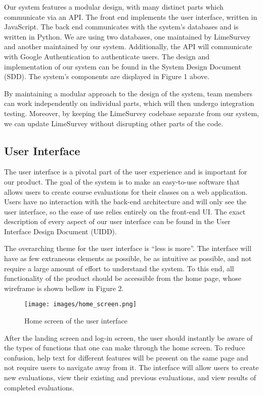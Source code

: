 \documentclass{article}
\begin{document}
Our system features a modular design, with many distinct parts which communicate via an API. The front end implements the user interface, written in JavaScript. The back end communicates with the system's databases and is written in Python. We are using two databases, one maintained by LimeSurvey and another maintained by our system. Additionally, the API will communicate with Google Authentication to authenticate users. The design and implementation of our system can be found in the System Design Document (SDD). The system's components are displayed in Figure 1 above.

By maintaining a modular approach to the design of the system, team members can work independently on individual parts, which will then undergo integration testing. Moreover, by keeping the LimeSurvey codebase separate from our system, we can update LimeSurvey without disrupting other parts of the code. 

\subsection{User Interface}

The user interface is a pivotal part of the user experience and is important for our product. The goal of the system is to make an easy-to-use software that allows users to create course evaluations for their classes on a web application.  Users have no interaction with the back-end architecture and will only see the user interface, so the ease of use relies entirely on the front-end UI.  The exact description of every aspect of our user interface can be found in the User Interface Design Document (UIDD). 

The overarching theme for the user interface is ``less is more''.  The interface will have as few extraneous elements as possible, be as intuitive as possible, and not require a large amount of effort to understand the system.  To this end, all functionality of the product should be accessible from the home page, whose wireframe is shown bellow in Figure 2. 

\begin{center}
\begin{figure}[H]
    \centering
    \texttt{[image: images/home\_screen.png]}
    \caption{Home screen of the user interface}
\end{figure}
\end{center}

After the landing screen and log-in screen, the user should instantly be aware of the types of functions that one can make through the home screen. To reduce confusion, help text for different features will be present on the same page and not require users to navigate away from it.  The interface will allow users to create new evaluations, view their existing and previous evaluations, and view results of completed evaluations.
\end{document}
